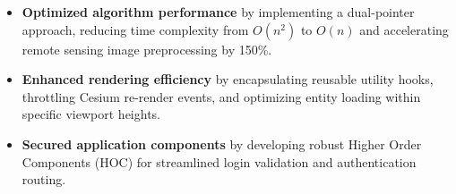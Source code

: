 \begin{itemize}
  \item \textbf{Optimized algorithm performance} by implementing a dual-pointer approach, reducing time complexity from $O(n^2)$ to $O(n)$ and accelerating remote sensing image preprocessing by 150\%.
  \item \textbf{Enhanced rendering efficiency} by encapsulating reusable utility hooks, throttling Cesium re-render events, and optimizing entity loading within specific viewport heights.
  \item \textbf{Secured application components} by developing robust Higher Order Components (HOC) for streamlined login validation and authentication routing.
\end{itemize}
